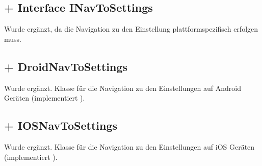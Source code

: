 \documentclass[../implementierung.tex]{subfiles}
\begin{document}
\subsection{+ Interface INavToSettings}
	Wurde ergänzt, da die Navigation zu den Einstellung plattformspezifisch erfolgen muss.
	\begin{itemize}
	\end{itemize}

\subsection{+ DroidNavToSettings}
	Wurde ergänzt. Klasse für die Navigation zu den Einstellungen auf Android Geräten (implementiert ).

\subsection{+ IOSNavToSettings}
	Wurde ergänzt. Klasse für die Navigation zu den Einstellungen auf iOS Geräten (implementiert ).
\end{document}
